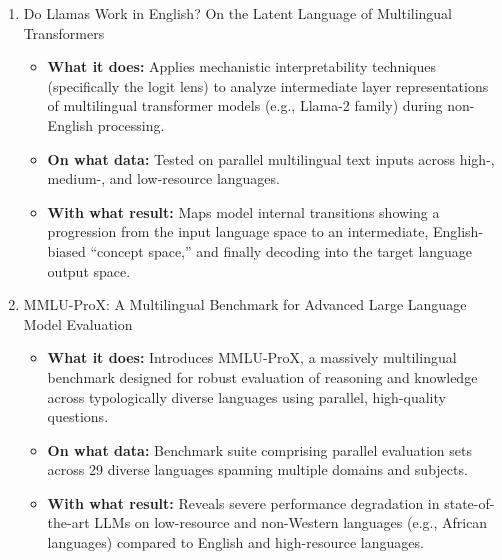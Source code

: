 \documentclass{article}
\begin{document}
\begin{enumerate}
    \item Do Llamas Work in English? On the Latent Language of Multilingual Transformers \textbf{\cite{wendler-etal-2024-llamas}}
    \begin{itemize}
        \item \textbf{What it does:} Applies mechanistic interpretability techniques (specifically the logit lens) to analyze intermediate layer representations of multilingual transformer models (e.g., Llama-2 family) during non-English processing.
        \item \textbf{On what data:} Tested on parallel multilingual text inputs across high-, medium-, and low-resource languages.
        \item \textbf{With what result:} Maps model internal transitions showing a progression from the input language space to an intermediate, English-biased ``concept space,'' and finally decoding into the target language output space.
    \end{itemize}

    \item MMLU-ProX: A Multilingual Benchmark for Advanced Large Language Model Evaluation \textbf{\cite{xuan-etal-2025-mmlu}}
    \begin{itemize}
        \item \textbf{What it does:} Introduces MMLU-ProX, a massively multilingual benchmark designed for robust evaluation of reasoning and knowledge across typologically diverse languages using parallel, high-quality questions.
        \item \textbf{On what data:} Benchmark suite comprising parallel evaluation sets across 29 diverse languages spanning multiple domains and subjects.
        \item \textbf{With what result:} Reveals severe performance degradation in state-of-the-art LLMs on low-resource and non-Western languages (e.g., African languages) compared to English and high-resource languages.
    \end{itemize}


\end{enumerate}
\end{document}
